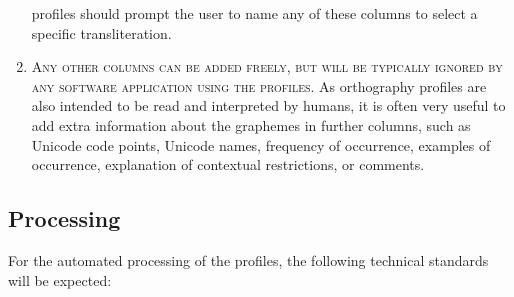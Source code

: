 \begin{enumerate}
       profiles should prompt the user to name any of these columns to select a
       specific transliteration. 
	\item \textsc{Any other columns can be added freely, but will be typically ignored
       by any software application using the profiles}. As orthography profiles
       are also intended to be read and interpreted by humans, it is often
       very useful to add extra information about the graphemes in further
       columns, such as Unicode code points, Unicode names, frequency of
       occurrence, examples of occurrence, explanation of contextual
       restrictions, or comments. 
 \end{enumerate}

\subsection*{Processing}
For the automated processing of the profiles, the following technical standards
will be expected:


